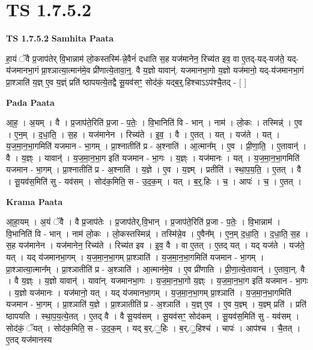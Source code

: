 \documentclass[17pt]{extarticle}
\begin{document}
\section*{ TS 1.7.5.2 }

\textbf{TS 1.7.5.2 } \newline
\textbf{Samhita Paata} \newline

हा॒यं ॅवै प्र॒जाप॑तेर् वि॒भान्नाम॑ लो॒कस्तस्मि॑-न्ने॒वैनं॑ दधाति स॒ह यज॑मानेन॒ रिच्य॑त इव॒ वा ए॒तद्-यद्-यज॑ते॒ यद्-य॑जमानभा॒गं प्रा॒श्ञात्या॒त्मान॑मे॒व प्री॑णात्ये॒तावा॒न्॒. वै य॒ज्ञो यावान्॑. यजमानभा॒गो य॒ज्ञो यज॑मानो॒ यद्-य॑जमानभा॒गं प्रा॒श्ञाति॑ य॒ज्ञ् ए॒व य॒ज्ञ्ं प्रति॑ ष्ठापयत्ये॒तद्वै सू॒यव॑सꣳ॒॒ सोद॑कं॒ यद्ब॒र्॒.हिश्चाऽऽप॑श्चै॒तद् - [ ] \newline

\textbf{Pada Paata} \newline

आ॒ह॒ । अ॒यम् । वै । प्र॒जाप॑ते॒रिति॑ प्र॒जा - प॒तेः॒ । वि॒भानिति॑ वि - भान् । नाम॑ । लो॒कः । तस्मिन्न्॑ । ए॒व । ए॒न॒म् । द॒धा॒ति॒ । स॒ह । यज॑मानेन । रिच्य॑ते । इ॒व॒ । वै । ए॒तत् । यत् । यज॑ते । यत् । य॒ज॒मा॒न॒भा॒गमिति॑ यजमान - भा॒गम् । प्रा॒श्नातीति॑ प्र - अ॒श्नाति॑ । आ॒त्मान᳚म् । ए॒व । प्री॒णा॒ति॒ । ए॒तावान्॑ । वै । य॒ज्ञ्ः । यावान्॑ । य॒ज॒मा॒न॒भा॒ग इति॑ यजमान - भा॒गः । य॒ज्ञ्ः । यज॑मानः । यत् । य॒ज॒मा॒न॒भा॒गमिति॑ यजमान - भा॒गम् । प्रा॒श्नातीति॑ प्र - अ॒श्नाति॑ । य॒ज्ञे । ए॒व । य॒ज्ञ्म् । प्रतीति॑ । स्था॒प॒य॒ति॒ । ए॒तत् । वै । सू॒यव॑स॒मिति॑ सु - यव॑सम् । सोद॑क॒मिति॒ स - उ॒द॒क॒म् । यत् । ब॒र्॒.हिः । च॒ । आपः॑ । च॒ । ए॒तत् ।  \newline


\textbf{Krama Paata} \newline

आ॒हा॒यम् । अ॒यं ॅवै । वै प्र॒जाप॑तेः । प्र॒जाप॑तेर्,वि॒भान् । प्र॒जाप॑ते॒रिति॑ प्र॒जा - प॒तेः॒ । वि॒भान्नाम॑ । वि॒भानिति॑ वि - भान् । नाम॑ लो॒कः । लो॒कस्तस्मिन्न्॑ । तस्मि॑न्ने॒व । ए॒वैन᳚म् । ए॒न॒म् द॒धा॒ति॒ । द॒धा॒ति॒ स॒ह । स॒ह यज॑मानेन । यज॑मानेन॒ रिच्य॑ते । रिच्य॑त इव । इ॒व॒ वै । वा ए॒तत् । ए॒तद् यत् । यद् यज॑ते । यज॑ते॒ यत् । 
यद् य॑जमानभा॒गम् । य॒ज॒मा॒न॒भा॒गम् प्रा॒श्ञाति॑ । य॒ज॒मा॒न॒भा॒गमिति॑ यजमान - भा॒गम् । प्रा॒श्ञात्या॒त्मान᳚म् । प्रा॒श्ञातीति॑ प्र - अ॒श्ञाति॑ । आ॒त्मान॑मे॒व । ए॒व प्री॑णाति । प्री॒णा॒त्ये॒तावान्॑ । ए॒तावा॒न्. वै । वै य॒ज्ञ्ः । य॒ज्ञो यावान्॑ । यावा॑न्. यजमानभा॒गः । य॒ज॒मा॒न॒भा॒गो य॒ज्ञ्ः । य॒ज॒मा॒न॒भा॒ग इति॑ यजमान - भा॒गः । य॒ज्ञो यज॑मानः । यज॑मानो॒ यत् । यद् य॑जमानभा॒गम् । य॒ज॒मा॒न॒भा॒गम् प्रा॒श्ञाति॑ । य॒ज॒मा॒न॒भा॒गमिति॑ यजमान - भा॒गम् । प्रा॒श्ञाति॑ य॒ज्ञे । प्रा॒श्ञातीति॑ प्र - अ॒श्ञाति॑ । य॒ज्ञ् ए॒व । ए॒व य॒ज्ञ्म् । य॒ज्ञ्म् प्रति॑ । प्रति॑ ष्ठापयति । स्था॒प॒य॒त्ये॒तत् । ए॒तद् वै । वै सू॒यव॑सम् । सू॒यव॑सꣳ॒॒ सोद॑कम् । सू॒यव॑स॒मिति॑ सु - यव॑सम् । सोद॑कं॒ ॅयत् । सोद॑क॒मिति॒ स - उ॒द॒क॒म् । यद् ब॒र्.॒॒॒हिः । ब॒र्.॒॒॒हिश्च॑ । चापः॑ । आप॑श्च । चै॒तत् । 
ए॒तद् यज॑मानस्य \newline
\end{document}
